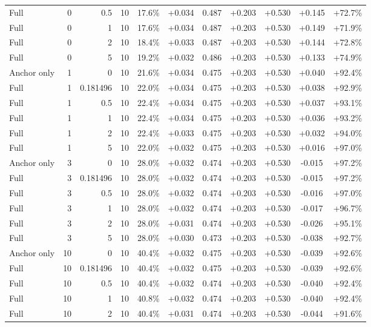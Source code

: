 \begin{table}[htbp]
\begin{tabular}{lrrrccccccc}
Full & 0 & 0.5 & 10 & 17.6\% & +0.034 & 0.487 & +0.203 & +0.530 & +0.145 & +72.7\% \\
Full & 0 & 1 & 10 & 17.6\% & +0.034 & 0.487 & +0.203 & +0.530 & +0.149 & +71.9\% \\
Full & 0 & 2 & 10 & 18.4\% & +0.033 & 0.487 & +0.203 & +0.530 & +0.144 & +72.8\% \\
Full & 0 & 5 & 10 & 19.2\% & +0.032 & 0.486 & +0.203 & +0.530 & +0.133 & +74.9\% \\
Anchor only & 1 & 0 & 10 & 21.6\% & +0.034 & 0.475 & +0.203 & +0.530 & +0.040 & +92.4\% \\
Full & 1 & 0.181496 & 10 & 22.0\% & +0.034 & 0.475 & +0.203 & +0.530 & +0.038 & +92.9\% \\
Full & 1 & 0.5 & 10 & 22.4\% & +0.034 & 0.475 & +0.203 & +0.530 & +0.037 & +93.1\% \\
Full & 1 & 1 & 10 & 22.4\% & +0.034 & 0.475 & +0.203 & +0.530 & +0.036 & +93.2\% \\
Full & 1 & 2 & 10 & 22.4\% & +0.033 & 0.475 & +0.203 & +0.530 & +0.032 & +94.0\% \\
Full & 1 & 5 & 10 & 22.0\% & +0.032 & 0.475 & +0.203 & +0.530 & +0.016 & +97.0\% \\
Anchor only & 3 & 0 & 10 & 28.0\% & +0.032 & 0.474 & +0.203 & +0.530 & -0.015 & +97.2\% \\
Full & 3 & 0.181496 & 10 & 28.0\% & +0.032 & 0.474 & +0.203 & +0.530 & -0.015 & +97.2\% \\
Full & 3 & 0.5 & 10 & 28.0\% & +0.032 & 0.474 & +0.203 & +0.530 & -0.016 & +97.0\% \\
Full & 3 & 1 & 10 & 28.0\% & +0.032 & 0.474 & +0.203 & +0.530 & -0.017 & +96.7\% \\
Full & 3 & 2 & 10 & 28.0\% & +0.031 & 0.474 & +0.203 & +0.530 & -0.026 & +95.1\% \\
Full & 3 & 5 & 10 & 28.0\% & +0.030 & 0.473 & +0.203 & +0.530 & -0.038 & +92.7\% \\
Anchor only & 10 & 0 & 10 & 40.4\% & +0.032 & 0.475 & +0.203 & +0.530 & -0.039 & +92.6\% \\
Full & 10 & 0.181496 & 10 & 40.4\% & +0.032 & 0.475 & +0.203 & +0.530 & -0.039 & +92.6\% \\
Full & 10 & 0.5 & 10 & 40.4\% & +0.032 & 0.474 & +0.203 & +0.530 & -0.040 & +92.4\% \\
Full & 10 & 1 & 10 & 40.8\% & +0.032 & 0.474 & +0.203 & +0.530 & -0.040 & +92.4\% \\
Full & 10 & 2 & 10 & 40.4\% & +0.031 & 0.474 & +0.203 & +0.530 & -0.044 & +91.6\% \\

\end{tabular}
\end{table}
